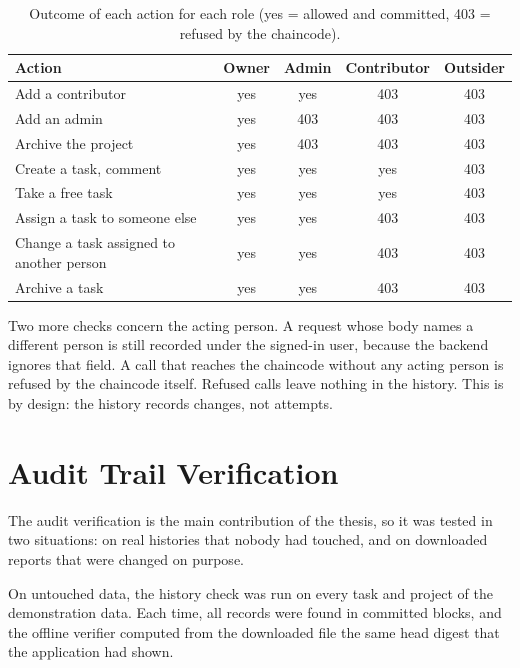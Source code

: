 \begin{table}[htbp]
    \centering
    \small
    \begin{tabular}{p{4.6cm}cccc}
        \toprule
        Action & Owner & Admin & Contributor & Outsider \\
        \midrule
        Add a contributor & yes & yes & 403 & 403 \\
        Add an admin & yes & 403 & 403 & 403 \\
        Archive the project & yes & 403 & 403 & 403 \\
        Create a task, comment & yes & yes & yes & 403 \\
        Take a free task & yes & yes & yes & 403 \\
        Assign a task to someone else & yes & yes & 403 & 403 \\
        Change a task assigned to another person & yes & yes & 403 & 403 \\
        Archive a task & yes & yes & 403 & 403 \\
        \bottomrule
    \end{tabular}
    \caption{Outcome of each action for each role (yes = allowed and committed, 403 = refused by the chaincode).}
    \label{tab:perm-results}
\end{table}

Two more checks concern the acting person. A request whose body names a different person is still recorded under the signed-in user, because the backend ignores that field. A call that reaches the chaincode without any acting person is refused by the chaincode itself. Refused calls leave nothing in the history. This is by design: the history records changes, not attempts.

\section{Audit Trail Verification}
\label{sec:results-audit}

The audit verification is the main contribution of the thesis, so it was tested in two situations: on real histories that nobody had touched, and on downloaded reports that were changed on purpose.

On untouched data, the history check was run on every task and project of the demonstration data. Each time, all records were found in committed blocks, and the offline verifier computed from the downloaded file the same head digest that the application had shown.

